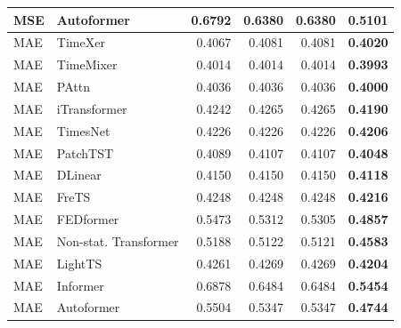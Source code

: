 \begin{longtable}{llrrrr}
MSE & Autoformer & 0.6792 & 0.6380 & 0.6380 & \textbf{0.5101} \\
\midrule
MAE & TimeXer & 0.4067 & 0.4081 & 0.4081 & \textbf{0.4020} \\
MAE & TimeMixer & 0.4014 & 0.4014 & 0.4014 & \textbf{0.3993} \\
MAE & PAttn & 0.4036 & 0.4036 & 0.4036 & \textbf{0.4000} \\
MAE & iTransformer & 0.4242 & 0.4265 & 0.4265 & \textbf{0.4190} \\
MAE & TimesNet & 0.4226 & 0.4226 & 0.4226 & \textbf{0.4206} \\
MAE & PatchTST & 0.4089 & 0.4107 & 0.4107 & \textbf{0.4048} \\
MAE & DLinear & 0.4150 & 0.4150 & 0.4150 & \textbf{0.4118} \\
MAE & FreTS & 0.4248 & 0.4248 & 0.4248 & \textbf{0.4216} \\
MAE & FEDformer & 0.5473 & 0.5312 & 0.5305 & \textbf{0.4857} \\
MAE & Non-stat. Transformer & 0.5188 & 0.5122 & 0.5121 & \textbf{0.4583} \\
MAE & LightTS & 0.4261 & 0.4269 & 0.4269 & \textbf{0.4204} \\
MAE & Informer & 0.6878 & 0.6484 & 0.6484 & \textbf{0.5454} \\
MAE & Autoformer & 0.5504 & 0.5347 & 0.5347 & \textbf{0.4744} \\
\end{longtable}
\endgroup

